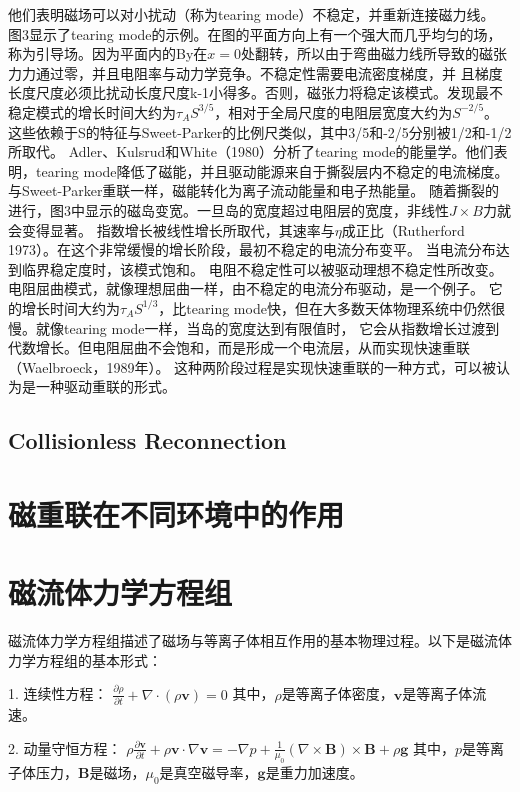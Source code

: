 \documentclass[12pt, a4paper, oneside]{article}
\begin{document}
\begin{spacing}{2.0}
他们表明磁场可以对小扰动（称为tearing mode）不稳定，并重新连接磁力线。
图3显示了tearing mode的示例。在图的平面方向上有一个强大而几乎均匀的场，
称为引导场。因为平面内的By在$x = 0$处翻转，所以由于弯曲磁力线所导致的磁张力力通过零，并且电阻率与动力学竞争。不稳定性需要电流密度梯度，并
且梯度长度尺度必须比扰动长度尺度k-1小得多。否则，磁张力将稳定该模式。发现最不稳定模式的增长时间大约为$\tau_AS^{3/5}$，相对于全局尺度的电阻层宽度大约为$S^{-2/5}$。
这些依赖于S的特征与Sweet-Parker的比例尺类似，其中3/5和-2/5分别被1/2和-1/2所取代。
Adler、Kulsrud和White（1980）分析了tearing mode的能量学。他们表明，tearing mode降低了磁能，并且驱动能源来自于撕裂层内不稳定的电流梯度。
与Sweet-Parker重联一样，磁能转化为离子流动能量和电子热能量。
随着撕裂的进行，图3中显示的磁岛变宽。一旦岛的宽度超过电阻层的宽度，非线性$J\times B$力就会变得显著。
指数增长被线性增长所取代，其速率与$\eta$成正比（Rutherford 1973）。在这个非常缓慢的增长阶段，最初不稳定的电流分布变平。
当电流分布达到临界稳定度时，该模式饱和。
电阻不稳定性可以被驱动理想不稳定性所改变。电阻屈曲模式，就像理想屈曲一样，由不稳定的电流分布驱动，是一个例子。
它的增长时间大约为$\tau_AS^{1/3}$，比tearing mode快，但在大多数天体物理系统中仍然很慢。就像tearing mode一样，当岛的宽度达到有限值时，
它会从指数增长过渡到代数增长。但电阻屈曲不会饱和，而是形成一个电流层，从而实现快速重联（Waelbroeck，1989年）。
这种两阶段过程是实现快速重联的一种方式，可以被认为是一种驱动重联的形式。
\subsection{Collisionless Reconnection}


\section{磁重联在不同环境中的作用}

\section{磁流体力学方程组}

磁流体力学方程组描述了磁场与等离子体相互作用的基本物理过程。以下是磁流体力学方程组的基本形式：

1. 连续性方程：
$\displaystyle \frac{\partial \rho}{\partial t} + \nabla \cdot (\rho \mathbf{v}) = 0$
其中，$\rho$是等离子体密度，$\mathbf{v}$是等离子体流速。

2. 动量守恒方程：
$\displaystyle \rho \frac{\partial \mathbf{v}}{\partial t} + \rho \mathbf{v} \cdot \nabla \mathbf{v} = -\nabla p + \frac{1}{\mu_0}(\nabla \times \mathbf{B}) \times \mathbf{B} + \rho \mathbf{g}$
其中，$p$是等离子体压力，$\mathbf{B}$是磁场，$\mu_0$是真空磁导率，$\mathbf{g}$是重力加速度。


\end{spacing}
\end{document}
